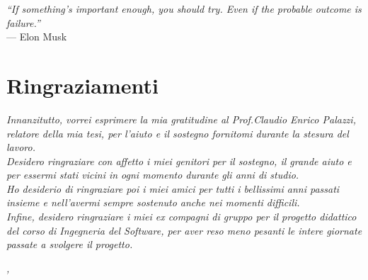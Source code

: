 
\cleardoublepage
{}
{}

\begin{flushright}{
	\slshape    
	``If something's important enough, you should try. Even if the probable outcome is failure.''} \\ 
	\medskip
   	--- Elon Musk 
\end{flushright}


\bigskip

\begingroup
\let\clearpage\relax
\let\cleardoublepage\relax
\let\cleardoublepage\relax

\chapter*{Ringraziamenti}

\noindent \textit{Innanzitutto, vorrei esprimere la mia gratitudine al Prof.Claudio Enrico Palazzi, relatore della mia tesi, per l'aiuto e il sostegno fornitomi durante la stesura del lavoro.}\\

\noindent \textit{Desidero ringraziare con affetto i miei genitori per il sostegno, il grande aiuto e per essermi stati vicini in ogni momento durante gli anni di studio.}\\

\noindent \textit{Ho desiderio di ringraziare poi i miei amici per tutti i bellissimi anni passati insieme e nell’avermi sempre sostenuto anche nei momenti difficili.}\\

\noindent \textit{Infine, desidero ringraziare i miei ex compagni di gruppo per il progetto didattico del corso di Ingegneria del Software, per aver reso meno pesanti le intere giornate passate a svolgere il progetto.}
\bigskip

\noindent\textit{\myLocation, \myTime}
\hfill \myName

\endgroup


